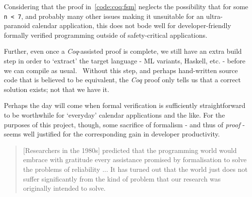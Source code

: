Considering that the proof in~\cref{code:coq:fsm} neglects the possibility that  for some \texttt{n < 7}, and probably many other issues making it unsuitable for an ultra-paranoid calendar application, this does not bode well for developer-friendly formally verified programming outside of safety-critical applications.

Further, even once a \emph{Coq}-assisted proof is complete, we still have an extra build step in order to `extract' the target language - ML variants, Haskell, etc. - before we can compile as usual.~\cite{coq_extraction} Without this step, and perhaps hand-written source code that is believed to be equivalent, the \emph{Coq} proof only tells us that a correct solution exists; not that we have it.

Perhaps the day will come when formal verification is sufficiently straightforward to be worthwhile for `everyday' calendar applications and the like. For the purposes of this project, though, some sacrifice of formalism - and thus of \emph{proof} - seems well justified for the corresponding gain in developer productivity.

\begin{quote}
[Researchers in the 1980s] predicted that the programming world would embrace with gratitude every assistance promised by formalisation to solve the problems of reliability ... It has turned out that the world just does not suffer significantly from the kind of problem that our research was originally intended to solve. \cite{hoare_quote}
\end{quote}